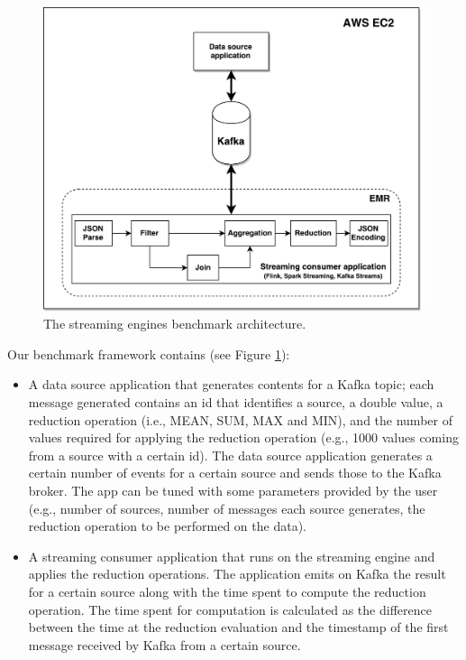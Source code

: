  \begin{figure}[h!]
\includegraphics[width=1\textwidth]{images/benchmark.pdf}
 \caption{The streaming engines benchmark architecture.}
\label{fig:benchmark_architecture}
\end{figure}

Our benchmark framework contains (see Figure \ref{fig:benchmark_architecture}):
\begin{itemize}
\item A data source application that generates contents for a Kafka topic; each message generated contains an id that identifies a source, a double value, a reduction operation (i.e., MEAN, SUM, MAX and MIN), and the number of values required for applying the reduction operation (e.g., 1000 values coming from a source with a certain id). The data source application generates a certain number of events for a certain source and sends those to the Kafka broker. 
The app can be tuned with some parameters provided by the user (e.g., number of sources, number of messages each source generates, the reduction operation to be performed on the data). 


\item A streaming consumer application that runs on the streaming engine and applies the reduction operations. The application emits on Kafka the result for a certain source along with the time spent to compute the reduction operation. The time spent for computation is calculated as the difference between the time at the reduction evaluation and the timestamp of the first message received by Kafka from a certain source.
\end{itemize}

